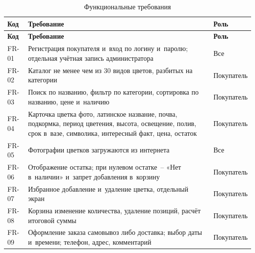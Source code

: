 \documentclass[14pt,a4paper]{extarticle}
\begin{document}
\begingroup\small\singlespacing\setlength{\LTpre}{6pt}\setlength{\LTpost}{10pt}
\begin{longtable}{|>{\centering\arraybackslash}p{}|>{\raggedright\arraybackslash}p{}|>{\centering\arraybackslash}p{}|}
\caption{Функциональные требования}\label{tab:3.1}\\
\hline
\rowcolor{gray!15}\centering\arraybackslash\bfseries Код & \centering\arraybackslash\bfseries Требование & \centering\arraybackslash\bfseries Роль \\ \hline
\endfirsthead
\hline
\rowcolor{gray!15}\centering\arraybackslash\bfseries Код & \centering\arraybackslash\bfseries Требование & \centering\arraybackslash\bfseries Роль \\ \hline
\endhead
\centering\arraybackslash FR-01 & Регистрация покупателя и~вход по логину и~паролю; отдельная учётная запись администратора & \centering\arraybackslash Все \\ \hline
\centering\arraybackslash FR-02 & Каталог не менее чем из 30 видов цветов, разбитых на категории & \centering\arraybackslash Покупатель \\ \hline
\centering\arraybackslash FR-03 & Поиск по названию, фильтр по категории, сортировка по названию, цене и~наличию & \centering\arraybackslash Покупатель \\ \hline
\centering\arraybackslash FR-04 & Карточка цветка фото, латинское название, почва, подкормка, период цветения, высота, освещение, полив, срок в~вазе, символика, интересный факт, цена, остаток & \centering\arraybackslash Покупатель \\ \hline
\centering\arraybackslash FR-05 & Фотографии цветков загружаются из интернета & \centering\arraybackslash Все \\ \hline
\centering\arraybackslash FR-06 & Отображение остатка; при нулевом остатке~– «Нет в~наличии» и~запрет добавления в~корзину & \centering\arraybackslash Покупатель \\ \hline
\centering\arraybackslash FR-07 & Избранное добавление и~удаление цветка, отдельный экран & \centering\arraybackslash Покупатель \\ \hline
\centering\arraybackslash FR-08 & Корзина изменение количества, удаление позиций, расчёт итоговой суммы & \centering\arraybackslash Покупатель \\ \hline
\centering\arraybackslash FR-09 & Оформление заказа самовывоз либо доставка; выбор даты и~времени; телефон, адрес, комментарий & \centering\arraybackslash Покупатель \\ \hline

\end{longtable}
\end{document}
